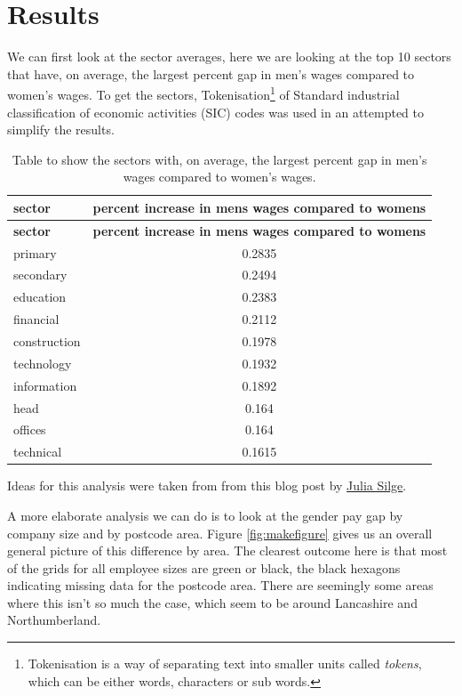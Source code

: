 \documentclass[
  11pt,
]{article}
\begin{document}
\newpage

\hypertarget{results}{%
\section{Results}\label{results}}

We can first look at the sector averages, here we are looking at the top
10 sectors that have, on average, the largest percent gap in men's wages
compared to women's wages. To get the sectors, Tokenisation\footnote{Tokenisation
  is a way of separating text into smaller units called \emph{tokens},
  which can be either words, characters or sub words.} of Standard
industrial classification of economic activities (SIC) codes was used in
an attempted to simplify the results.

\begin{longtable}[]{@{}lc@{}}
\caption{Table to show the sectors with, on average, the largest percent
gap in men's wages compared to women's wages.}\tabularnewline
\toprule()
\textbf{sector} & \textbf{percent increase in mens wages compared to
womens} \\
\midrule()
\endfirsthead
\toprule()
\textbf{sector} & \textbf{percent increase in mens wages compared to
womens} \\
\midrule()
\endhead
primary & 0.2835 \\
secondary & 0.2494 \\
education & 0.2383 \\
financial & 0.2112 \\
construction & 0.1978 \\
technology & 0.1932 \\
information & 0.1892 \\
head & 0.164 \\
offices & 0.164 \\
technical & 0.1615 \\
\bottomrule()
\end{longtable}

Ideas for this analysis were taken from from this blog post by
\href{https://juliasilge.com/blog/pay-gap-uk/}{Julia Silge}.

A more elaborate analysis we can do is to look at the gender pay gap by
company size and by postcode area. Figure \ref{fig:makefigure} gives us
an overall general picture of this difference by area. The clearest
outcome here is that most of the grids for all employee sizes are green
or black, the black hexagons indicating missing data for the postcode
area. There are seemingly some areas where this isn't so much the case,
which seem to be around Lancashire and Northumberland.
\end{document}
